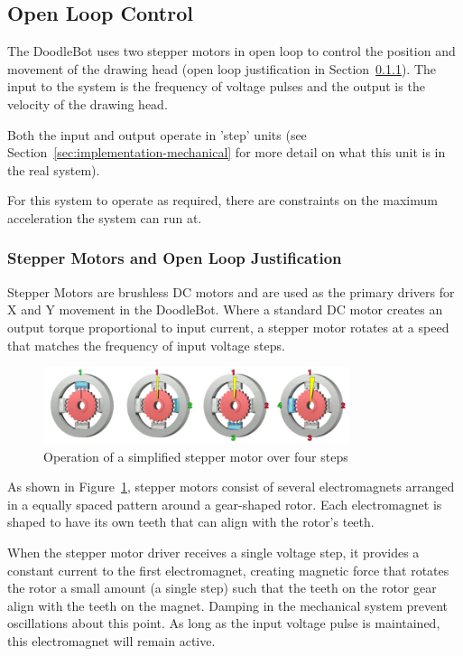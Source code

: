 \subsection{Open Loop Control}
	The DoodleBot uses two stepper motors in open loop to control the position and movement of the drawing head (open loop justification in Section~\ref{sec:control-stepper}). The input to the system is the frequency of voltage pulses and the output is the velocity of the drawing head. 
	
	Both the input and output operate in 'step' units (see Section~\ref*{sec:implementation-mechanical} for more detail on what this unit is in the real system).
	
	For this system to operate as required, there are constraints on the maximum acceleration the system can run at.
	
	\subsubsection{Stepper Motors and Open Loop Justification}
		\label{sec:control-stepper}
			
		Stepper Motors are brushless DC motors and are used as the primary drivers for X and Y movement in the DoodleBot. Where a standard DC motor creates an output torque proportional to input current, a stepper motor rotates at a speed that matches the frequency of input voltage steps.
		
		\begin{figure}[h]
			\centering
			\includegraphics[width=0.8\textwidth]{figures/optimisation/steppermotor}
			\caption{Operation of a simplified stepper motor over four steps}
			\label{fig:stepper}
		\end{figure}
		
		As shown in Figure~\ref{fig:stepper}, stepper motors consist of several electromagnets arranged in a equally spaced pattern around a gear-shaped rotor. Each electromagnet is shaped to have its own teeth that can align with the rotor's teeth. 
		
		When the stepper motor driver receives a single voltage step, it provides a constant current to the first electromagnet, creating magnetic force that rotates the rotor a small amount (a single step) such that the teeth on the rotor gear align with the teeth on the magnet. Damping in the mechanical system prevent oscillations about this point. As long as the input voltage pulse is maintained, this electromagnet will remain active.
		
